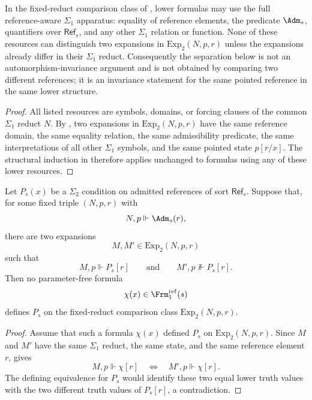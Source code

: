 \begin{corollary}\label{cor:reference-aware-resources-fixed}
In the fixed-reduct comparison class of , lower formulas may use the full reference-aware $\Sigma_1$ apparatus: equality of reference elements, the predicate $\Adm_s$, quantifiers over $\mathsf{Ref}_s$, and any other $\Sigma_1$ relation or function. None of these resources can distinguish two expansions in $\mathrm{Exp}_2(N,p,r)$ unless the expansions already differ in their $\Sigma_1$ reduct. Consequently the separation below is not an automorphism-invariance argument and is not obtained by comparing two different references; it is an invariance statement for the same pointed reference in the same lower structure.
\end{corollary}

\begin{proof}
All listed resources are symbols, domains, or forcing clauses of the common $\Sigma_1$ reduct $N$. By , two expansions in $\mathrm{Exp}_2(N,p,r)$ have the same reference domain, the same equality relation, the same admissibility predicate, the same interpretations of all other $\Sigma_1$ symbols, and the same pointed state $p[r/x]$. The structural induction in  therefore applies unchanged to formulas using any of these lower resources.
\end{proof}

\begin{lemma}\label{lem:fixed-reduct-variation-obstruction}
Let $P_s(x)$ be a $\Sigma_2$ condition on admitted references of sort $\mathsf{Ref}_s$. Suppose that, for some fixed triple $(N,p,r)$ with
\[
N,p\Vdash\Adm_s(r),
\]
there are two expansions
\[
M,M'\in \mathrm{Exp}_2(N,p,r)
\]
such that
\[
M,p\Vdash P_s[r]
\qquad\text{and}\qquad
M',p\nVdash P_s[r].
\]
Then no parameter-free formula
\[
\chi(x)\in\Frm_1^{\mathrm{ref}}(s)
\]
defines $P_s$ on the fixed-reduct comparison class $\mathrm{Exp}_2(N,p,r)$.
\end{lemma}

\begin{proof}
Assume that such a formula $\chi(x)$ defined $P_s$ on $\mathrm{Exp}_2(N,p,r)$. Since $M$ and $M'$ have the same $\Sigma_1$ reduct, the same state, and the same reference element $r$,  gives
\[
M,p\Vdash\chi[r]
\quad\Longleftrightarrow\quad
M',p\Vdash\chi[r].
\]
The defining equivalence for $P_s$ would identify these two equal lower truth values with the two different truth values of $P_s[r]$, a contradiction.
\end{proof}

